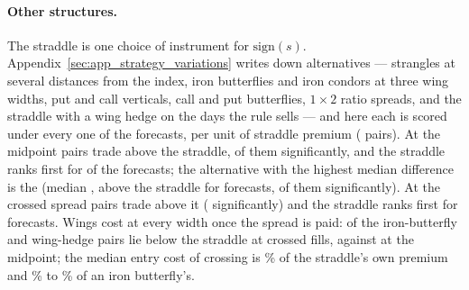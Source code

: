 \paragraph{Other structures.} The straddle is one choice of instrument for %
$\mathrm{sign}(s)$. Appendix~\ref{sec:app_strategy_variations} writes down
\cmSvN{} alternatives --- strangles at several distances from the index, iron
butterflies and iron condors at three wing widths, put and call verticals, call
and put butterflies, $1\times 2$ ratio spreads, and the straddle with a wing
hedge on the days the rule sells --- and here each is scored under every one of the
\cmSvSetN{} forecasts, per unit of straddle premium (\cmSvSetPairsN{} pairs). At the midpoint
\cmSvSetAboveMid{} pairs trade above the straddle, \cmSvSetAboveMidSig{} of them
significantly, and the straddle ranks first for \cmSvSetStraddleFirstMid{} of the forecasts;
the alternative with the highest median difference is the \cmSvSetBestMidLabel{} (median
\cmSvSetBestMidMed, above the straddle for \cmSvSetBestMidAboveN{} forecasts,
\cmSvSetBestMidAboveSig{} of them significantly). At the crossed spread \cmSvSetAboveX{}
pairs trade above it (\cmSvSetAboveXSig{} significantly) and the straddle ranks first for
\cmSvSetStraddleFirstX{} forecasts. Wings cost at every width once the spread is paid:
\cmSvSetWingXBelow{} of the \cmSvSetWingN{} iron-butterfly and wing-hedge pairs lie below the
straddle at crossed fills, against \cmSvSetWingMidBelow{} at the midpoint; the median entry
cost of crossing is \cmSvCostStraddle\% of the straddle's own premium and
\cmSvCostIbfMin\% to \cmSvCostIbfMax\% of an iron butterfly's.

